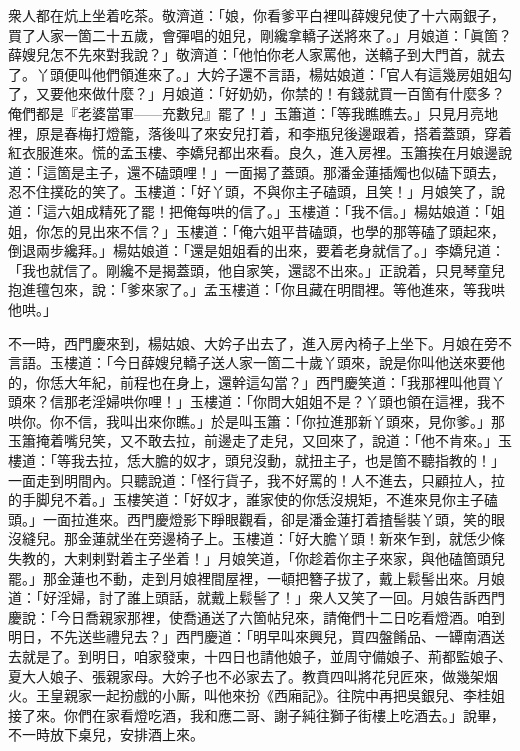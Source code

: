 衆人都在炕上坐着吃茶。敬濟道：「娘，你看爹平白裡叫薛嫂兒使了十六兩銀子，買了人家一箇二十五歲，會彈唱的姐兒，剛纔拿轎子送將來了。」月娘道：「眞箇？薛嫂兒怎不先來對我說？」敬濟道：「他怕你老人家罵他，送轎子到大門首，就去了。丫頭便叫他們領進來了。」大妗子還不言語，楊姑娘道：「官人有這幾房姐姐勾了，又要他來做什麼？」月娘道：「好奶奶，你禁的！有錢就買一百箇有什麼多？俺們都是『老婆當軍——充數兒』罷了！」{}玉簫道：「等我瞧瞧去。」只見月亮地裡，原是春梅打燈籠，落後叫了來安兒打着，和李瓶兒後邊跟着，搭着蓋頭，穿着紅衣服進來。慌的孟玉樓、李嬌兒都出來看。{}良久，進入房裡。玉簫挨在月娘邊說道：「這箇是主子，還不磕頭哩！」一面揭了蓋頭。那潘金蓮插燭也似磕下頭去，忍不住撲矻的笑了。玉樓道：「好丫頭，不與你主子磕頭，且笑！」月娘笑了，說道：「這六姐成精死了罷！把俺每哄的信了。」玉樓道：「我不信。」{}楊姑娘道：「姐姐，你怎的見出來不信？」玉樓道：「俺六姐平昔磕頭，也學的那等磕了頭起來，倒退兩步纔拜。」楊姑娘道：「還是姐姐看的出來，要着老身就信了。」李嬌兒道：「我也就信了。剛纔不是揭蓋頭，他自家笑，還認不出來。」{}正說着，只見琴童兒抱進氊包來，說：「爹來家了。」孟玉樓道：「你且藏在明間裡。等他進來，等我哄他哄。」

不一時，西門慶來到，楊姑娘、大妗子出去了，進入房內椅子上坐下。月娘在旁不言語。玉樓道：「今日薛嫂兒轎子送人家一箇二十歲丫頭來，說是你叫他送來要他的，你恁大年紀，前程也在身上，還幹這勾當？」西門慶笑道：「我那裡叫他買丫頭來？信那老淫婦哄你哩！」玉樓道：「你問大姐姐不是？丫頭也領在這裡，我不哄你。你不信，我叫出來你瞧。」於是叫玉簫：「你拉進那新丫頭來，見你爹。」那玉簫掩着嘴兒笑，又不敢去拉，前邊走了走兒，又回來了，說道：「他不肯來。」玉樓道：「等我去拉，恁大膽的奴才，頭兒沒動，就扭主子，也是箇不聽指教的！」一面走到明間內。只聽說道：「怪行貨子，我不好罵的！人不進去，只顧拉人，拉的手脚兒不着。」玉樓笑道：「好奴才，誰家使的你恁沒規矩，不進來見你主子磕頭。」一面拉進來。西門慶燈影下睜眼觀看，卻是潘金蓮打着揸髻裝丫頭，笑的眼沒縫兒。{}那金蓮就坐在旁邊椅子上。玉樓道：「好大膽丫頭！新來乍到，就恁少條失教的，大剌剌對着主子坐着！」月娘笑道，「你趁着你主子來家，與他磕箇頭兒罷。」那金蓮也不動，走到月娘裡間屋裡，一頓把簪子拔了，戴上鬏髻出來。月娘道：「好淫婦，討了誰上頭話，就戴上鬏髻了！」衆人又笑了一回。月娘告訴西門慶說：「今日喬親家那裡，使喬通送了六箇帖兒來，請俺們十二日吃看燈酒。咱到明日，不先送些禮兒去？」西門慶道：「明早叫來興兒，買四盤餚品、一罈南酒送去就是了。到明日，咱家發柬，十四日也請他娘子，並周守備娘子、荊都監娘子、夏大人娘子、張親家母。大妗子也不必家去了。教賁四叫將花兒匠來，做幾架烟火。王皇親家一起扮戲的小厮，叫他來扮《西廂記》。往院中再把吳銀兒、李桂姐接了來。你們在家看燈吃酒，我和應二哥、謝子純往獅子街樓上吃酒去。」說畢，不一時放下桌兒，安排酒上來。

